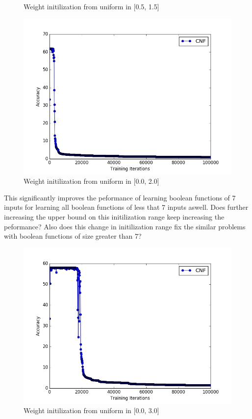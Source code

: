 \documentclass{article}
\theoremstyle{definition}
\begin{document}
\begin{figure}[H]
\begin{minipage}[b]{0.4\textwidth}
    \caption{Weight initilization from uniform in [0.5, 1.5]}
  \end{minipage}
\begin{minipage}[b]{0.4\textwidth}
    \includegraphics[width=\textwidth]{CNF-LD-WI-03.png}
    \caption{Weight initilization from uniform in [0.0, 2.0]}
  \end{minipage}
\end{figure}

This significantly improves the peformance of learning boolean functions of 7 inputs for learning all boolean functions of less that 7 inputs aswell. Does further increasing the upper bound on this initilization range keep increasing the peformance? Also does this change in initilization range fix the similar problems with boolean functions of size greater than 7?

\begin{figure}[H]
\centering
  \begin{minipage}[b]{0.4\textwidth}
    \includegraphics[width=\textwidth]{CNF-LD-WI-04.png}
    \caption{Weight initilization from uniform in [0.0, 3.0]}
  \end{minipage}
  \hfill
\end{figure}
\end{document}
